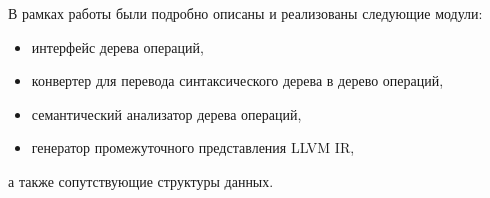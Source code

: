 В рамках работы были подробно описаны и реализованы следующие модули:

\begin{itemize}
    \item интерфейс дерева операций,
    \item конвертер для перевода синтаксического дерева в дерево операций,
    \item семантический анализатор дерева операций,
    \item генератор промежуточного представления LLVM IR,
\end{itemize}

а также сопутствующие структуры данных.
